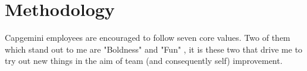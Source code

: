 \section{Methodology}
Capgemini employees are encouraged to follow seven core values. Two of them
which stand out to me are "Boldness" and "Fun" \cite{CapValues}, it is these
two that
drive me to try out new things in the aim of team (and consequently self)
improvement.

